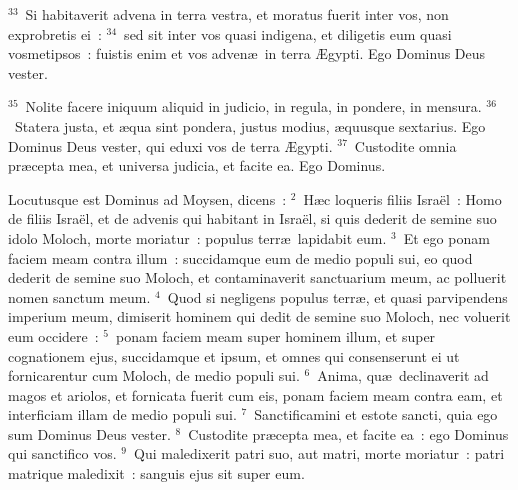 ${}^{33}$~Si habitaverit advena in terra vestra, et moratus fuerit inter vos, non exprobretis ei~:
${}^{34}$~sed sit inter vos quasi indigena, et diligetis eum quasi vosmetipsos~: fuistis enim et vos adven\ae\ in terra \AE gypti. Ego Dominus Deus vester.


${}^{35}$~Nolite facere iniquum aliquid in judicio, in regula, in pondere, in mensura.
${}^{36}$~Statera justa, et \ae qua sint pondera, justus modius, \ae quusque sextarius. Ego Dominus Deus vester, qui eduxi vos de terra \AE gypti.
${}^{37}$~Custodite omnia pr\ae cepta mea, et universa judicia, et facite ea. Ego Dominus.

\lettrine[lines=3,image=true,loversize=0.05,lraise=-0.03]{L}{}ocutusque est Dominus ad Moysen, dicens~:
${}^{2}$~H\ae c loqueris filiis Isra\"el~: Homo de filiis Isra\"el, et de advenis qui habitant in Isra\"el, si quis dederit de semine suo idolo Moloch, morte moriatur~: populus terr\ae\ lapidabit eum.
${}^{3}$~Et ego ponam faciem meam contra illum~: succidamque eum de medio populi sui, eo quod dederit de semine suo Moloch, et contaminaverit sanctuarium meum, ac polluerit nomen sanctum meum.
${}^{4}$~Quod si negligens populus terr\ae , et quasi parvipendens imperium meum, dimiserit hominem qui dedit de semine suo Moloch, nec voluerit eum occidere~:
${}^{5}$~ponam faciem meam super hominem illum, et super cognationem ejus, succidamque et ipsum, et omnes qui consenserunt ei ut fornicarentur cum Moloch, de medio populi sui.
${}^{6}$~Anima, qu\ae\ declinaverit ad magos et ariolos, et fornicata fuerit cum eis, ponam faciem meam contra eam, et interficiam illam de medio populi sui.
${}^{7}$~Sanctificamini et estote sancti, quia ego sum Dominus Deus vester.
${}^{8}$~Custodite pr\ae cepta mea, et facite ea~: ego Dominus qui sanctifico vos.
${}^{9}$~Qui maledixerit patri suo, aut matri, morte moriatur~: patri matrique maledixit~: sanguis ejus sit super eum.


